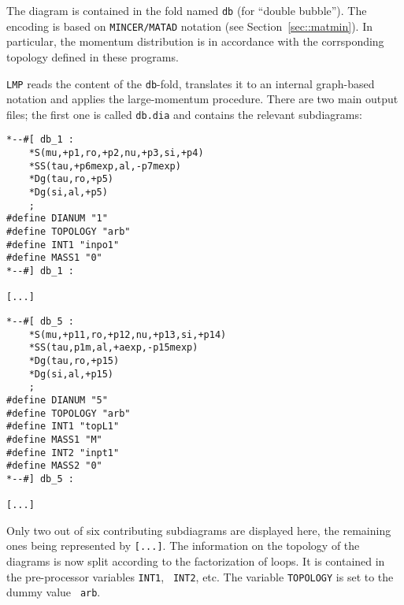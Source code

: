 The diagram is contained in the fold named {\tt db} (for ``double
bubble''). The encoding is based on {\tt MINCER/MATAD} notation (see
Section~\ref{sec::matmin}). In particular, the momentum distribution
is in accordance with the corrsponding topology
defined in these programs.

{\tt LMP} reads the content of the {\tt db}-fold, translates it to an
internal graph-based notation and applies the large-momentum procedure.
There are two main output files; the first one is called {\tt db.dia}
and contains the relevant subdiagrams:
\begin{verbatim}
*--#[ db_1 :
    *S(mu,+p1,ro,+p2,nu,+p3,si,+p4)
    *SS(tau,+p6mexp,al,-p7mexp)
    *Dg(tau,ro,+p5)
    *Dg(si,al,+p5)
    ;
#define DIANUM "1"
#define TOPOLOGY "arb"
#define INT1 "inpo1"
#define MASS1 "0"
*--#] db_1 :

[...]
\end{verbatim}
\begin{verbatim}
*--#[ db_5 :
    *S(mu,+p11,ro,+p12,nu,+p13,si,+p14)
    *SS(tau,p1m,al,+aexp,-p15mexp)
    *Dg(tau,ro,+p15)
    *Dg(si,al,+p15)
    ;
#define DIANUM "5"
#define TOPOLOGY "arb"
#define INT1 "topL1"
#define MASS1 "M"
#define INT2 "inpt1"
#define MASS2 "0"
*--#] db_5 :

[...]
\end{verbatim}
Only two out of six contributing subdiagrams are displayed here, the
remaining ones being represented by {\tt [...]}.  The information on the
topology of the diagrams is now split according to the factorization of
loops. It is contained in the pre-processor variables {\tt INT1}, {\tt
  INT2}, etc. The variable {\tt TOPOLOGY} is set to the dummy value {\tt
  arb}.

